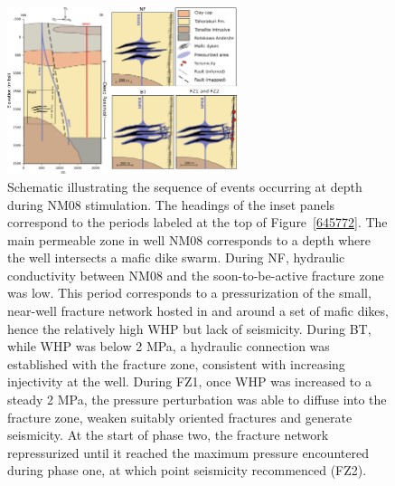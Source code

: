 \begin{figure}
\begin{center}
\includegraphics[width=0.6\textwidth,height=\textheight,keepaspectratio]{Chapter_3_Nga/figures/NM08_stimulation_cartoon/NM08_stimulation_cartoon}
\caption[Schematic of mechanisms responsible for NM08 seismicity]{{
Schematic illustrating the sequence of events occurring at depth during
NM08 stimulation. The headings of the inset panels correspond to the
periods labeled at the top of Figure~{\ref{645772}}.
The main permeable zone in well NM08 corresponds to a depth where the
well intersects a mafic dike swarm. During NF, hydraulic conductivity
between NM08 and the soon-to-be-active fracture zone was low. This
period corresponds to a pressurization of the small, near-well fracture
network hosted in and around a set of mafic dikes, hence the relatively
high \acrshort{WHP} but lack of seismicity. During BT, while \acrshort{WHP} was below 2 MPa, a
hydraulic connection was established with the fracture zone, consistent
with increasing \gls{injectivity} at the well. During FZ1, once \acrshort{WHP} was
increased to a steady 2 MPa, the pressure perturbation was able to
diffuse into the fracture zone, weaken suitably oriented fractures and
generate seismicity. At the start of phase two, the fracture network
repressurized until it reached the maximum pressure encountered during
phase one, at which point seismicity recommenced (FZ2).
{\label{740510}}%
}}
\end{center}
\end{figure}

